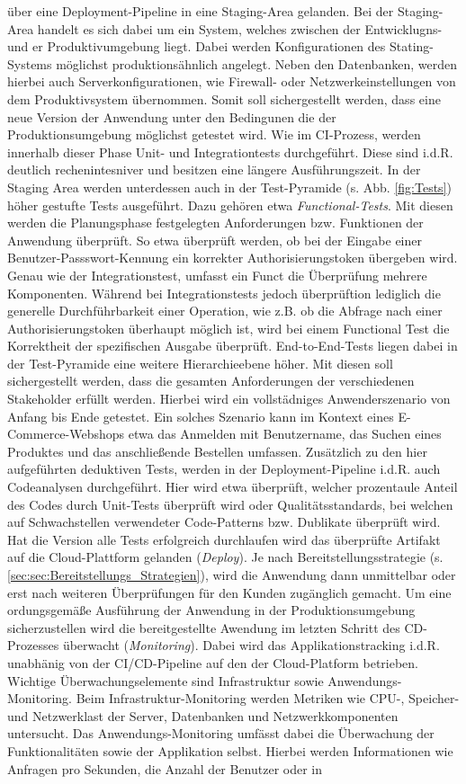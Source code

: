 über eine Deployment-Pipeline in eine Staging-Area gelanden. Bei der Staging-Area handelt es sich dabei um ein System, welches zwischen der Entwicklugns- und er Produktivumgebung liegt. Dabei werden Konfigurationen des Stating-Systems möglichst produktionsähnlich angelegt. Neben den Datenbanken, werden hierbei auch Serverkonfigurationen, wie Firewall- oder Netzwerkeinstellungen von dem Produktivsystem übernommen. Somit soll sichergestellt werden, dass eine neue Version der Anwendung unter den Bedingunen die der Produktionsumgebung möglichst getestet wird. Wie im CI-Prozess, werden innerhalb dieser Phase Unit- und Integrationtests durchgeführt. Diese sind i.d.R. deutlich rechenintesniver und besitzen eine längere Ausführungszeit. In der Staging Area werden unterdessen auch in der Test-Pyramide (s. Abb. \ref*{fig:Tests}) höher gestufte Tests ausgeführt. Dazu gehören etwa \textit{Functional-Tests}. Mit diesen werden die Planungsphase festgelegten Anforderungen bzw. Funktionen der Anwendung überprüft. So etwa überprüft werden, ob bei der Eingabe einer Benutzer-Passswort-Kennung ein korrekter Authorisierungstoken übergeben wird. Genau wie der Integrationstest, umfasst ein Funct die Überprüfung mehrere Komponenten. Während bei Integrationstests jedoch überprüftion lediglich die generelle Durchführbarkeit einer Operation, wie z.B. ob die Abfrage nach einer Authorisierungstoken überhaupt möglich ist, wird bei einem Functional Test die Korrektheit der spezifischen Ausgabe überprüft. End-to-End-Tests liegen dabei in der Test-Pyramide eine weitere Hierarchieebene höher. Mit diesen soll sichergestellt werden, dass die gesamten Anforderungen der verschiedenen Stakeholder erfüllt werden. Hierbei wird ein vollstädniges Anwenderszenario von Anfang bis Ende getestet. Ein solches Szenario kann im Kontext eines E-Commerce-Webshops etwa das Anmelden mit Benutzername, das Suchen eines Produktes und das anschließende Bestellen umfassen. Zusätzlich zu den hier aufgeführten deduktiven Tests, werden in der Deployment-Pipeline i.d.R. auch Codeanalysen durchgeführt. Hier wird etwa überprüft, welcher prozentaule Anteil des Codes durch Unit-Tests überprüft wird oder Qualitätsstandards, bei welchen auf Schwachstellen verwendeter Code-Patterns bzw. Dublikate überprüft wird. Hat die Version alle Tests erfolgreich durchlaufen wird das überprüfte Artifakt auf die Cloud-Plattform gelanden (\textit{Deploy}). Je nach Bereitstellungsstrategie (s. \ref*{sec:sec:Bereitstellungs_Strategien}), wird die Anwendung dann unmittelbar oder erst nach weiteren Überprüfungen für den Kunden zugänglich gemacht. Um eine ordungsgemäße Ausführung der Anwendung in der Produktionsumgebung sicherzustellen wird die bereitgestellte Awendung im letzten Schritt des CD-Prozesses überwacht (\textit{Monitoring}). Dabei wird das Applikationstracking i.d.R. unabhänig von der CI/CD-Pipeline auf den der Cloud-Platform betrieben. Wichtige Überwachungselemente sind Infrastruktur sowie Anwendungs-Monitoring. Beim Infrastruktur-Monitoring werden Metriken wie CPU-, Speicher- und Netzwerklast der Server, Datenbanken und Netzwerkkomponenten untersucht. Das Anwendungs-Monitoring umfässt dabei die Überwachung der Funktionalitäten sowie der Applikation selbst. Hierbei werden Informationen wie Anfragen pro Sekunden, die Anzahl der Benutzer oder in 
